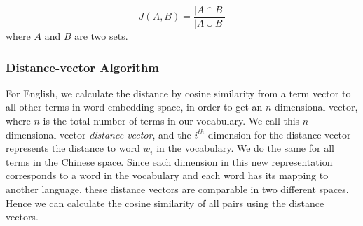 \begin{equation*}
J(A,B)=\frac{|A \cap B|}{|A \cup B|}
\end{equation*}
where $A$ and $B$ are two sets.

\subsubsection{Distance-vector Algorithm}

For English, we calculate the distance by cosine similarity from a
term vector to all other terms in word embedding space,
in order to get an $n$-dimensional vector, where $n$ is the total number of
terms in our vocabulary. We call this $n$-dimensional vector
{\em distance vector}, and the $i^{th}$ dimension for the distance
vector represents the distance to word $w_i$ in the vocabulary.
We do the same for all terms in the Chinese space.
Since each dimension in this new representation corresponds to a word in the
vocabulary and each word has its mapping to another language,
these distance vectors are comparable in two different spaces.
Hence we can calculate the cosine similarity of all pairs using
the distance vectors.

%
